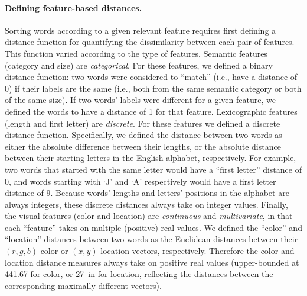 \documentclass[11pt]{article}
\begin{document}
\paragraph{Defining feature-based distances.} Sorting words according to a
given relevant feature requires first defining a distance function for
quantifying the dissimilarity between each pair of features. This function
varied according to the type of features. Semantic features (category and size)
are \textit{categorical}. For these features, we defined a binary distance
function: two words were considered to ``match'' (i.e., have a distance of 0)
if their labels are the same (i.e., both from the same semantic category or
both of the same size). If two words' labels were different for a given
feature, we defined the words to have a distance of 1 for that feature.
Lexicographic features (length and first letter) are \textit{discrete}. For
these features we defined a discrete distance function. Specifically, we
defined the distance between two words as either the absolute difference
between their lengths, or the absolute distance between their starting letters
in the English alphabet, respectively. For example, two words that started with
the same letter would have a ``first letter'' distance of 0, and words starting
with `J' and `A' respectively would have a first letter distance of 9. Because
words' lengths and letters' positions in the alphabet are always integers,
these discrete distances always take on integer values. Finally, the visual
features (color and location) are \textit{continuous} and
\textit{multivariate}, in that each ``feature'' takes on multiple (positive)
real values. We defined the ``color'' and ``location'' distances between two
words as the Euclidean distances between their $(r, g, b)$ color or $(x, y)$
location vectors, respectively. Therefore the color and location distance
measures always take on positive real values (upper-bounded at 441.67 for
color, or 27~in for location, reflecting the distances between the
corresponding maximally different vectors).
\end{document}
